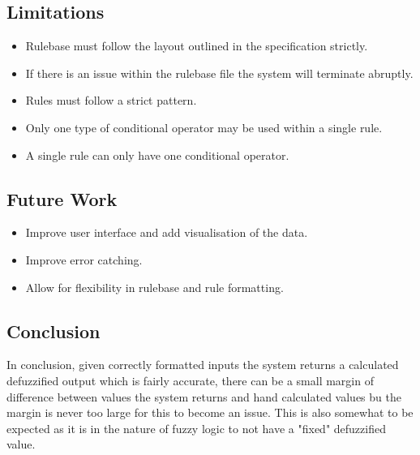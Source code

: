 \documentclass{article}
\begin{document}
\subsection{Limitations}
\begin{itemize}
  \item Rulebase must follow the layout outlined in the specification strictly.
  \item If there is an issue within the rulebase file the system will terminate abruptly.
  \item Rules must follow a strict pattern.
  \item Only one type of conditional operator may be used within a single rule.
  \item A single rule can only have one conditional operator.
\end{itemize}
\subsection{Future Work}
\begin{itemize}
  \item Improve user interface and add visualisation of the data.
  \item Improve error catching.
  \item Allow for flexibility in rulebase and rule formatting.
\end{itemize}

\subsection{Conclusion}
In conclusion, given correctly formatted inputs the system returns a calculated defuzzified output which is fairly accurate, there can be a small margin of difference between values the system returns and hand calculated values bu the margin is never too large for this to become an issue. This is also somewhat to be expected as it is in the nature of fuzzy logic to not have a "fixed" defuzzified value.

\appendix
\end{document}
